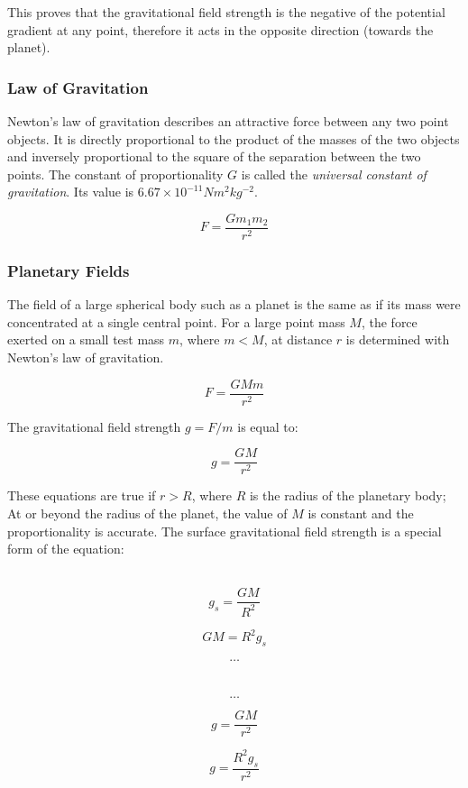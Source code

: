 \documentclass[12pt]{article}
\begin{document}
This proves that the gravitational field strength is the negative of the potential gradient at any point, therefore it acts in the opposite direction (towards the planet).

\subsubsection{Law of Gravitation}
\label{sec:org947ec71}

Newton's law of gravitation describes an attractive force between any two point objects. It is directly proportional to the product of the masses of the two objects and inversely proportional to the square of the separation between the two points. The constant of proportionality \(G\) is called the \emph{universal constant of gravitation}. Its value is \(6.67 \times 10^{-11} \text{} Nm^2kg^{-2}\).

\[F = \dfrac{Gm_1m_2}{r^2}\]


\subsubsection{Planetary Fields}
\label{sec:orgd65b4bd}

The field of a large spherical body such as a planet is the same as if its mass were concentrated at a single central point. For a large point mass \(M\), the force exerted on a small test mass \(m\), where \(m < M\), at distance \(r\) is determined with Newton's law of gravitation.

\[F = \dfrac{GMm}{r^2}\]

The gravitational field strength \(g = F / m\) is equal to:

\[g = \dfrac{GM}{r^2}\]

These equations are true if \(r > R\), where \(R\) is the radius of the planetary body; At or beyond the radius of the planet, the value of \(M\) is constant and the proportionality is accurate. The surface gravitational field strength is a special form of the equation:


\begin{figure}[H]
\centering
\begin{minipage}{.8\textwidth}
\begin{tcolorbox}[
sharp corners=all,
colback=white,
colframe=white,
size=tight,
boxrule=0.2mm,
left=10mm, right=10mm
]
\begin{multicols}{2}
\noindent
\\
\[g_s = \dfrac{GM}{R^2}\]

\[GM = R^2g_s \]

\[\textbf{\ldots}\]
\\
\columnbreak
\\
\[\textbf{\ldots}\]

\[g = \dfrac{GM}{r^2}\]

\[g = \dfrac{R^2g_s}{r^2}\]
\\

\end{multicols}
\end{tcolorbox}
\end{minipage}
\end{figure}
\end{document}
